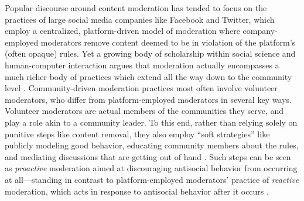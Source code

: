 \documentclass[11pt,letterpaper]{article}
\begin{document}
Popular discourse around content moderation has tended to focus on the practices of large social media companies like Facebook and Twitter, which employ a centralized, platform-driven model of moderation where company-employed moderators remove content deemed to be in violation of the platform's (often opaque) rules.
Yet a growing body of scholarship within social science and human-computer interaction argues that moderation actually encompasses a much richer body of practices which extend all the way down to the community level \cite{brewer_inclusion_2020,lampe_slashdot_2004,seering_reconsidering_2020}.
Community-driven moderation practices most often involve volunteer moderators, who differ from platform-employed moderators in several key ways.
Volunteer moderators are actual members of the communities they serve, and play a role akin to a community leader.
To this end, rather than relying solely on punitive steps like content removal, they also employ ``soft strategies'' like publicly modeling good behavior, educating community members about the rules, and mediating discussions that are getting out of hand \cite{seering_shaping_2017,billings_understanding_2010}.
Such steps can be seen as \emph{proactive} moderation aimed at discouraging antisocial behavior from occurring at all---standing in contrast to platform-employed moderators' practice of \emph{reactive} moderation, which acts in response to antisocial behavior after it occurs \cite{lo_when_2018}.


\end{document}

